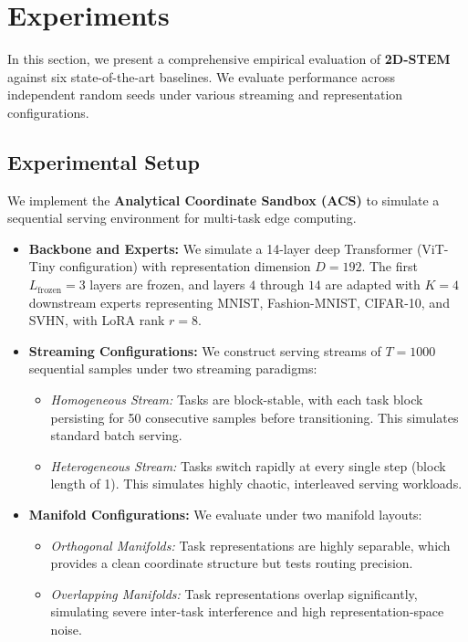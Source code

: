 \section{Experiments}
\label{sec:experiments}

In this section, we present a comprehensive empirical evaluation of \textbf{2D-STEM} against six state-of-the-art baselines. We evaluate performance across independent random seeds under various streaming and representation configurations.

\subsection{Experimental Setup}
We implement the \textbf{Analytical Coordinate Sandbox (ACS)} to simulate a sequential serving environment for multi-task edge computing.
\begin{itemize}
    \item \textbf{Backbone and Experts:} We simulate a 14-layer deep Transformer (ViT-Tiny configuration) with representation dimension $D = 192$. The first $L_{\text{frozen}} = 3$ layers are frozen, and layers $4$ through $14$ are adapted with $K = 4$ downstream experts representing MNIST, Fashion-MNIST, CIFAR-10, and SVHN, with LoRA rank $r = 8$.
    \item \textbf{Streaming Configurations:} We construct serving streams of $T = 1000$ sequential samples under two streaming paradigms:
    \begin{itemize}
        \item \emph{Homogeneous Stream:} Tasks are block-stable, with each task block persisting for 50 consecutive samples before transitioning. This simulates standard batch serving.
        \item \emph{Heterogeneous Stream:} Tasks switch rapidly at every single step (block length of 1). This simulates highly chaotic, interleaved serving workloads.
    \end{itemize}
    \item \textbf{Manifold Configurations:} We evaluate under two manifold layouts:
    \begin{itemize}
        \item \emph{Orthogonal Manifolds:} Task representations are highly separable, which provides a clean coordinate structure but tests routing precision.
        \item \emph{Overlapping Manifolds:} Task representations overlap significantly, simulating severe inter-task interference and high representation-space noise.
    \end{itemize}
\end{itemize}

